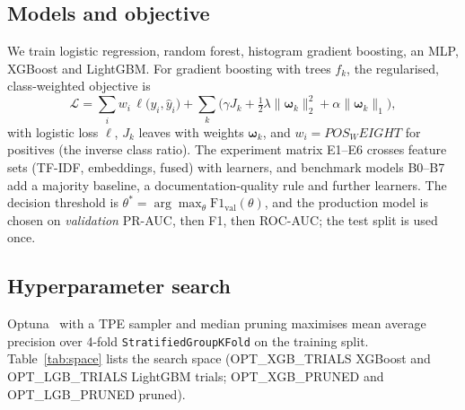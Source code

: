 \documentclass[conference]{IEEEtran}
\begin{document}
\subsection{Models and objective}
We train logistic regression, random forest, histogram gradient boosting, an MLP, XGBoost and LightGBM. For gradient boosting with trees $f_k$, the regularised, class-weighted objective is
\begin{equation}
\mathcal{L}=\sum_{i} w_i\,\ell\big(y_i,\hat y_i\big)+\sum_{k}\Big(\gamma J_k+\tfrac12\lambda\|\boldsymbol\omega_k\|_2^2+\alpha\|\boldsymbol\omega_k\|_1\Big),
\end{equation}
with logistic loss $\ell$, $J_k$ leaves with weights $\boldsymbol\omega_k$, and $w_i={{POS_WEIGHT}}$ for positives (the inverse class ratio). The experiment matrix E1--E6 crosses feature sets (TF-IDF, embeddings, fused) with learners, and benchmark models B0--B7 add a majority baseline, a documentation-quality rule and further learners. The decision threshold is $\theta^*=\arg\max_\theta \mathrm{F1}_{\text{val}}(\theta)$, and the production model is chosen on \emph{validation} PR-AUC, then F1, then ROC-AUC; the test split is used once.

\subsection{Hyperparameter search}
Optuna~\cite{optuna} with a TPE sampler and median pruning maximises mean average precision over 4-fold \texttt{StratifiedGroupKFold} on the training split. Table~\ref{tab:space} lists the search space ({{OPT_XGB_TRIALS}} XGBoost and {{OPT_LGB_TRIALS}} LightGBM trials; {{OPT_XGB_PRUNED}} and {{OPT_LGB_PRUNED}} pruned).
\begin{table}[t]\centering\caption{Optuna search space (log = log-uniform)}\label{tab:space}
\end{table}
\end{document}
